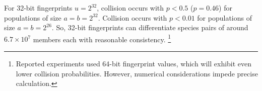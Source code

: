 For 32-bit fingerprints $u = 2^{32}$, collision occurs with $p < 0.5$ ($p = 0.46$) for populations of size $a = b = 2^{32}$.
Collision occurs with $p < 0.01$ for populations of size $a = b = 2^{26}$.
So, 32-bit fingerprints can differentiate species pairs of around $6.7 \times 10^{7}$ members each with reasonable consistency.%
\footnote{
Reported experiments used 64-bit fingerprint values, which will exhibit even lower collision probabilities.
However, numerical considerations impede precise calculation.
}
